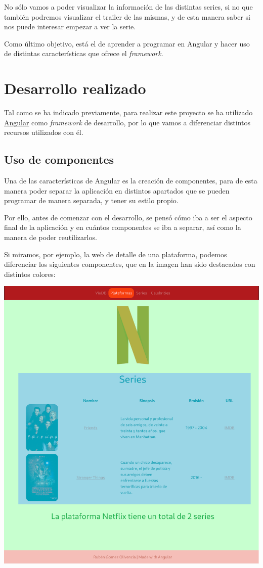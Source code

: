 \documentclass{\ClassPath/viu-tfm-template}
\begin{document}
No sólo vamos a poder visualizar la información de las distintas series, si no que también podremos visualizar el trailer de las mismas, y de esta manera saber si nos puede interesar empezar a ver la serie.

Como último objetivo, está el de aprender a programar en Angular y hacer uso de distintas características que ofrece el \textit{framework}.

\chapter{Desarrollo realizado}
Tal como se ha indicado previamente, para realizar este proyecto se ha utilizado \href{https://angular.io/}{Angular} como \textit{framework} de desarrollo, por lo que vamos a diferenciar distintos recursos utilizados con él.

\section{Uso de componentes}
Una de las características de Angular es la creación de componentes, para de esta manera poder separar la aplicación en distintos apartados que se pueden programar de manera separada, y tener su estilo propio.

Por ello, antes de comenzar con el desarrollo, se pensó cómo iba a ser el aspecto final de la aplicación y en cuántos componentes se iba a separar, así como la manera de poder reutilizarlos.

Si miramos, por ejemplo, la web de detalle de una plataforma, podemos diferenciar los siguientes componentes, que en la imagen han sido destacados con distintos colores:

\vspace{-1.2em}
\begin{center}
    \includegraphics[frame,width=0.58\linewidth]{img/componentes.png}
\end{center}
\vspace{-1em}
\end{document}
